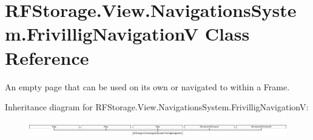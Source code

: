 \hypertarget{class_r_f_storage_1_1_view_1_1_navigations_system_1_1_frivillig_navigation_v}{}\section{R\+F\+Storage.\+View.\+Navigations\+System.\+Frivillig\+NavigationV Class Reference}
\label{class_r_f_storage_1_1_view_1_1_navigations_system_1_1_frivillig_navigation_v}


An empty page that can be used on its own or navigated to within a Frame.  


Inheritance diagram for R\+F\+Storage.\+View.\+Navigations\+System.\+Frivillig\+NavigationV\+:\begin{figure}[H]
\begin{center}
\leavevmode
\includegraphics[height=0.664688cm]{class_r_f_storage_1_1_view_1_1_navigations_system_1_1_frivillig_navigation_v}
\end{center}
\end{figure}
